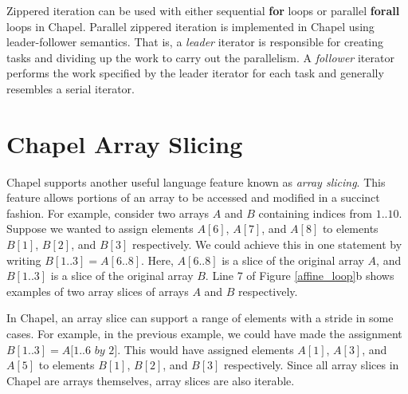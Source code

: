 Zippered iteration can be used with either sequential \textbf{for} loops or parallel \textbf{forall} loops in Chapel. Parallel zippered iteration is implemented in Chapel using leader-follower semantics. That is, a \textit{leader} iterator is responsible for creating tasks and dividing up the work to carry out the parallelism. A \textit{follower} iterator performs the work specified by the leader iterator for each task and generally resembles a serial iterator. 

\section{Chapel Array Slicing}\label{sec:array_slicing}

Chapel supports another useful language feature known as \textit{array slicing}. This feature allows portions of an array to be accessed and modified in a succinct fashion. For example, consider two arrays $A$ and $B$ containing indices from $1..10$. Suppose we wanted to assign elements $A[6]$, $A[7]$, and $A[8]$ to elements $B[1]$, $B[2]$, and $B[3]$ respectively. We could achieve this in one statement by writing $B[1..3] = A[6..8]$. Here, $A[6..8]$ is a slice of the original array $A$, and $B[1..3]$ is a slice of the original array $B$. Line 7 of Figure \ref{affine_loop}b shows examples of two array slices of arrays $A$ and $B$ respectively.

In Chapel, an array slice can support a range of elements with a stride in some cases. For example, in the previous example, we could have made the assignment $B[1..3] = A[1..6$ $by$ $2]$. This would have assigned elements $A[1]$, $A[3]$, and $A[5]$ to elements $B[1]$, $B[2]$, and $B[3]$ respectively. Since all array slices in Chapel are arrays themselves, array slices are also iterable. 

